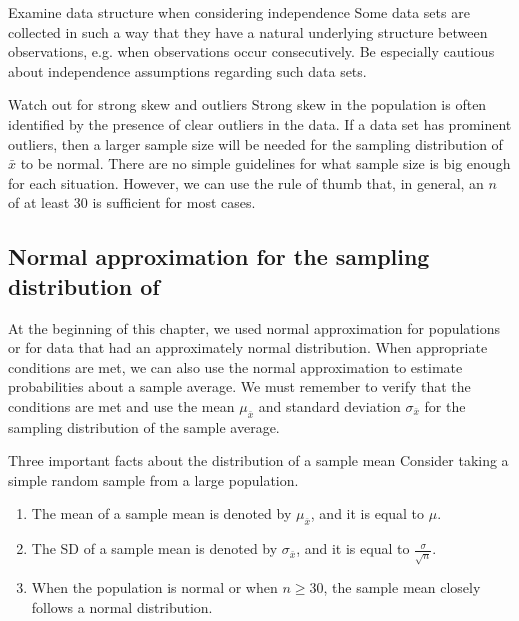 \begin{onebox}{Examine data structure when considering independence}
{Some data sets are collected in such a way that they have a natural underlying structure between observations, e.g. when observations occur consecutively. Be especially cautious about independence assumptions regarding such data sets.}
\end{onebox}

\begin{onebox}{Watch out for strong skew and outliers}
{Strong skew in the population is often identified by the presence of clear outliers in the data. If a data set has prominent outliers, then a larger sample size will be needed for the sampling distribution of $\bar{x}$ to be normal. There are no simple guidelines for what sample size is big enough for each situation. However, we can use the rule of thumb that, in general, an $n$ of at least 30 is sufficient for most cases.}
\end{onebox}


\D{\newpage}

\subsection[Normal approximation for the sampling distribution of $\bar{x}$]{Normal approximation for the sampling distribution of }

At the beginning of this chapter, we used normal approximation for populations or for data that had an approximately normal distribution. When appropriate conditions are met, we can also use the normal approximation to estimate probabilities about a sample average. We must remember to verify that the conditions are met and use the mean $\mu_{\bar{x}}$ and standard deviation $\sigma_{\bar{x}}$ for the sampling distribution of the sample average.

\begin{onebox}{Three important facts about the distribution of a sample mean }
Consider taking a simple random sample from a large population.
\begin{enumerate}
\setlength{\itemsep}{0mm}
\item The mean of a sample mean is denoted by $\mu_{\bar{x}}$, and it is equal to $\mu$.
\item The SD of a sample mean is denoted by $\sigma_{\bar{x}}$, and it is equal to $\frac{\sigma}{\sqrt{n}}$.
\item When the population is normal or when $n\ge 30$, the sample mean closely follows a normal distribution. 
\end{enumerate}\end{onebox}


